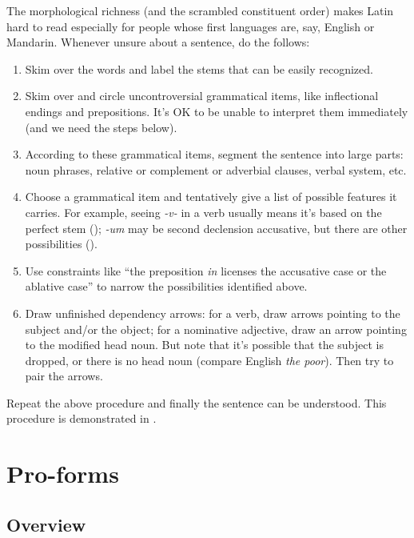 \documentclass[a4paper, oneside, 12pt]{report}
\newcommand{\form}[1]{\emph{#1}}
\begin{document}
The morphological richness (and the scrambled constituent order)
makes Latin hard to read 
especially for people whose first languages are, say, 
English or Mandarin. 
Whenever unsure about a sentence, do the follows: 
\begin{enumerate}
    \item Skim over the words and label the stems that can be easily recognized.  
    \item Skim over and circle uncontroversial grammatical items,  
        like inflectional endings and prepositions. 
        It's OK to be unable to interpret them immediately (and we need the steps below).
    \item According to these grammatical items, 
        segment the sentence into large parts:
        noun phrases, relative or complement or adverbial clauses, 
        verbal system, etc.
    \item Choose a grammatical item and tentatively give a list of possible features it carries.  
        For example, seeing \form{-v-} in a verb usually means
        it's based on the perfect stem
        ();
        \form{-um} may be second declension accusative,
        but there are other possibilities
        (). 
    \item Use constraints like 
        ``the preposition \form{in} licenses the accusative case or the ablative case'' 
        to narrow the possibilities identified above.
    \item Draw unfinished dependency arrows:
        for a verb, draw arrows pointing to the subject and/or the object; 
        for a nominative adjective, draw an arrow pointing to the modified head noun. 
        But note that it's possible that the subject is dropped, 
        or there is no head noun (compare English \form{the poor}).
        Then try to pair the arrows.
\end{enumerate}
Repeat the above procedure and finally the sentence can be understood. 
This procedure is demonstrated in .

\chapter{Pro-forms}\label{chap:pro-forms}

\section{Overview}
\end{document}
